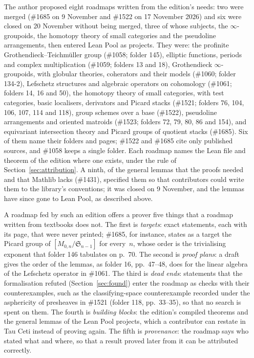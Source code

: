 \documentclass[runningheads,a4paper]{llncs}
\begin{document}
The author proposed eight roadmaps written from the edition's needs: two were merged (\#1685 on 9 November and \#1522 on 17 November 2026) and six were closed on 20 November without being merged, three of whose subjects, the $\infty$-groupoids, the homotopy theory of small categories and the pseudoline arrangements, then entered Lean Pool as projects. They were: the profinite Grothendieck--Teichmüller group (\#1058; folder 145), elliptic functions, periods and complex multiplication (\#1059; folders 13 and 18), Grothendieck $\infty$-groupoids, with globular theories, coherators and their models (\#1060; folder 134-2), Lefschetz structures and algebraic operators on cohomology (\#1061; folders 14, 16 and 50), the homotopy theory of small categories, with test categories, basic localisers, derivators and Picard stacks (\#1521; folders 76, 104, 106, 107, 114 and 118), group schemes over a base (\#1522), pseudoline arrangements and oriented matroids (\#1523; folders 72, 79, 80, 86 and 154), and equivariant intersection theory and Picard groups of quotient stacks (\#1685). Six of them name their folders and pages; \#1522 and \#1685 cite only published sources, and \#1058 keeps a single folder. Each roadmap names the Lean file and theorem of the edition where one exists, under the rule of Section~\ref{sec:attribution}. A ninth, of the general lemmas that the proofs needed and that Mathlib lacks (\#1431), specified them so that contributors could write them to the library's conventions; it was closed on 9 November, and the lemmas have since gone to Lean Pool, as described above.

A roadmap fed by such an edition offers a prover five things that a roadmap written from textbooks does not. The first is \emph{targets}: exact statements, each with its page, that were never printed; \#1685, for instance, states as a target the Picard group of $[M_{0,n}/\mathfrak S_{n-1}]$ for every~$n$, whose order is the trivialising exponent that folder 146 tabulates on p.~70. The second is \emph{proof plans}: a draft gives the order of the lemmas, as folder 16, pp.~47--48, does for the linear algebra of the Lefschetz operator in \#1061. The third is \emph{dead ends}: statements that the formalisation refuted (Section~\ref{sec:found}) enter the roadmap as checks with their counterexamples, such as the classifying-space counterexample recorded under the asphericity of presheaves in \#1521 (folder 118, pp.~33--35), so that no search is spent on them. The fourth is \emph{building blocks}: the edition's compiled theorems and the general lemmas of the Lean Pool projects, which a contributor can restate in Tau Ceti instead of proving again. The fifth is \emph{provenance}: the roadmap says who stated what and where, so that a result proved later from it can be attributed correctly.
\end{document}
